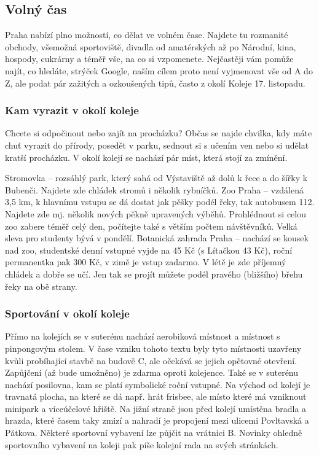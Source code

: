 \subsection{Volný čas}
Praha nabízí plno možností, co dělat ve volném čase. Najdete tu rozmanité obchody, všemožná sportoviště, divadla od amatérských až po Národní, kina, hospody, cukrárny a téměř vše, na co si vzpomenete. Nejčastěji vám pomůže najít, co hledáte, strýček Google, naším cílem proto není vyjmenovat vše od A do Z, ale podat pár zažitých a ozkoušených tipů, často z okolí Koleje 17. listopadu.

\subsubsection{Kam vyrazit v okolí koleje}
Chcete si odpočinout nebo zajít na procházku? Občas se najde chvilka, kdy máte chuť vyrazit do přírody, posedět v parku, sednout si s učením ven nebo si udělat kratší procházku. V okolí kolejí se nachází pár míst, která stojí za zmínění.

Stromovka – rozsáhlý park, který sahá od Výstaviště až dolů k řece a do šířky k Bubenči. Najdete zde chládek stromů i několik rybníčků.
Zoo Praha – vzdálená 3,5 km, k hlavnímu vstupu se dá dostat jak pěšky podél řeky, tak autobusem 112. Najdete zde mj. několik nových pěkně upravených výběhů. Prohlédnout si celou zoo zabere téměř celý den, počítejte také s větším počtem návštěvníků. Velká sleva pro studenty bývá v pondělí.
Botanická zahrada Praha – nachází se kousek nad zoo, studentské denní vstupné vyjde na 45 Kč (s Lítačkou 43 Kč), roční permanentka pak 300 Kč, v zimě je vstup zadarmo. V létě je zde příjemný chládek a dobře se učí.
Jen tak se projít můžete podél pravého (bližšího) břehu řeky na obě strany.


\subsubsection{Sportování v okolí koleje}
Přímo na kolejích se v suterénu nachází aerobiková místnost a místnost s pinpongovým stolem. V čase vzniku tohoto textu byly tyto místnosti uzavřeny kvůli probíhající stavbě na budově C, ale očekává se jejich opětovné otevření. Zapůjčení (až bude umožněno) je zdarma oproti kolejence. Také se v suterénu nachází posilovna, kam se platí symbolické roční vstupné. Na východ od kolejí je travnatá plocha, na které se dá např. hrát frisbee, ale místo které má vzniknout minipark a víceúčelové hřiště. Na jižní straně jsou před kolejí umístěna bradla a hrazda, které časem taky zmizí a nahradí je propojení mezi ulicemi Povltavská a Pátkova. Některé sportovní vybavení lze půjčit na vrátnici B. Novinky ohledně sportovního vybavení na koleji pak píše kolejní rada na svých stránkách.

